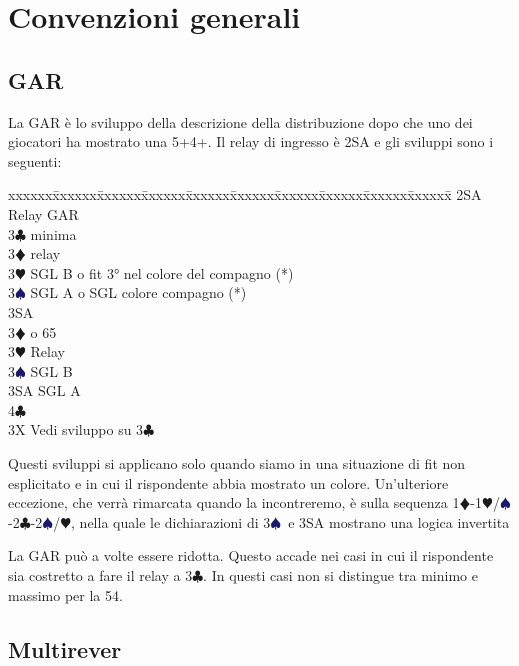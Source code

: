 \documentclass[a4paper,italian]{article}
\newcommand{\BC}{\textcolor{OliveGreen}{$\clubsuit$}}
\newcommand{\BD}{\textcolor{RedOrange}{$\vardiamondsuit$}}
\newcommand{\BH}{\textcolor{Red2}{$\varheartsuit${}}}
\newcommand{\BS}{\textcolor{MidnightBlue}{$\spadesuit${}}}
\newenvironment{bidtable}
{\begin{tabbing}

    xxxxxx\=xxxxxx\=xxxxxx\=xxxxxx\=xxxxxx\=xxxxxx\=xxxxxx\=xxxxxx\=xxxxxx\=xxxxxx\=\kill}
{\end{tabbing} }%
\newenvironment{attenzione}[1]
{\begin{tcolorbox}[colframe=red!80!white,title=#1]}
    {
\end{tcolorbox} }%
\begin{document}
\newpage
\setcounter{page}{1}

\section{Convenzioni generali}

\subsection{GAR}\label{GAR}

La GAR è lo sviluppo della descrizione della distribuzione dopo che uno dei giocatori ha mostrato una 5+4+. Il relay di ingresso è 2SA e gli sviluppi sono i seguenti:
\bigbreak

\begin{bidtable}
    2SA \> Relay GAR\+\\
    3\BC {} minima\+\\
    3\BD \> relay\+\\
    3\BH \> SGL B o fit 3° nel colore del compagno (*)\\
    3\BS \> SGL A o SGL colore compagno (*)\\
    3SA \-\-\\
    3\BD {} o 65\+\\
    3\BH \> Relay\+\\
    3\BS \> SGL B\\
    3SA \> SGL A\\
    4\BC {}\-\-\\
    3X \> Vedi sviluppo su 3\BC \-
\end{bidtable}
\bigbreak
\begin{attenzione}{ATTENZIONE(*)}
    Questi sviluppi si applicano solo quando siamo in una situazione di fit non esplicitato e in cui il rispondente abbia mostrato un colore. Un'ulteriore eccezione, che verrà rimarcata quando la incontreremo, è sulla sequenza 1\BD -1\BH/\BS-2\BC -2\BS/\BH, nella quale le dichiarazioni di 3\BS\ e 3SA mostrano una logica invertita
\end{attenzione}
\bigbreak
La GAR può a volte essere ridotta. Questo accade nei casi in cui il rispondente sia costretto a fare il relay a 3\BC . In questi casi non si distingue tra minimo e massimo per la 54.
\bigbreak

\subsection{Multirever}\label{multirever}
\end{document}
